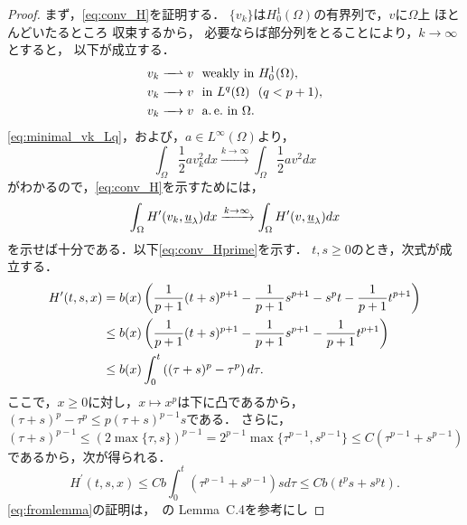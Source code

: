 \begin{proof}
 まず，\eqref{eq:conv_H}を証明する．
 $\{ v_k \}$は$H_0^1(\Omega)$の有界列で，$v$に$\Omega$上
 ほとんどいたるところ
 収束するから，
 必要ならば部分列をとることにより，$k \to \infty$とすると，
 以下が成立する．
 \begin{align}
  v_k \xrightharpoonup{ \mbox{ ~ } } v & \ \ \text{weakly~} \tin
  H_0^1(\Omega), \label{eq:minimal_vk_weakly} \\
  v_k \xrightarrow{ \mbox{ ~ } } v & \ \ \tin L^q(\Omega) \ \
   (q < p+1), \label{eq:minimal_vk_Lq} \\
  v_k \xrightarrow{ \mbox{ ~ } } v & \ \ \ae \tin \Omega. 
    \label{eq:minimal_vk_ae}
 \end{align}
 \eqref{eq:minimal_vk_Lq}，および，$a \in L^\infty(\Omega)$より，
 \[
  \int_\Omega \frac{1}{2} a v_k^2 dx \xrightarrow{k \to \infty}
 \int_\Omega \frac{1}{2}av^2 dx
 \]
 がわかるので，\eqref{eq:conv_H}を示すためには，
 \begin{equation}
  \int_\Omega H^\prime(v_k, \underline{u}_\lambda)dx \xrightarrow{ k \to \infty } 
  \int_\Omega H^\prime(v, \underline{u}_\lambda)dx \label{eq:conv_Hprime} \\  
 \end{equation}
 を示せば十分である．以下\eqref{eq:conv_Hprime}を示す．
 $t, s \geq 0$のとき，次式が成立する．
 \begin{align}
  H^\prime(t, s, x) &= b(x) \left( \frac{1}{p+1}(t+s)^{p+1} -
  \frac{1}{p+1} s^{p+1} - s^p t - \frac{1}{p+1} t^{p+1} \right) \notag \\
  & \leq b(x) \left( \frac{1}{p+1}(t+s)^{p+1} - \frac{1}{p+1}s^{p+1} -
  \frac{1}{p+1} t^{p+1}\right) \notag \\
  & \leq b(x) \int_0^t \left( (\tau + s)^p - \tau^p \right)
  d\tau. \label{eq:dtau} 
 \end{align}
 ここで，$x \geq 0$に対し，$x \mapsto x^p$は下に凸であるから，
 $(\tau + s)^p - \tau^p \leq p(\tau + s)^{p-1} s$である．
 さらに，
 \begin{equation}
  (\tau + s)^{p-1} \leq (2 \max\{\tau , s\})^{p-1} = 2^{p-1} \max \{
   \tau^{p-1}, s^{p-1} \} \leq C (\tau^{p-1} + s^{p-1}) \label{eq:taus2p-1}
 \end{equation}
 であるから，次が得られる．
 \begin{equation}
  H^\prime(t, s, x) \leq C b \int_0^t (\tau^{p-1} + s^{p-1}) s d \tau
   \leq C b ( t^{p} s + s^{p} t). \label{eq:fromlemma}
 \end{equation}
 \eqref{eq:fromlemma}の証明は，\cite{MR2317491}~の Lemma~C.4を参考にし

\end{proof}
